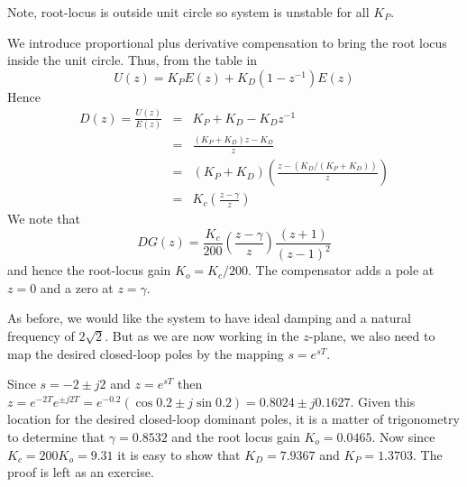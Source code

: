 \begin{slide}\label{slides:l12s18}
	\begin{center}
	\end{center}
	Note, root-locus is outside unit circle so system is unstable for all $K_P$.
\end{slide}

We introduce proportional plus derivative compensation to bring the root locus inside the unit circle. Thus, from the table in  $$U(z)=K_PE(z)+K_D(1-z^{-1})E(z)$$ Hence
\begin{eqnarray*}
	D(z) = \frac{U(z)}{E(z)} & = & K_P + K_D - K_D z^{-1} \\
	& = & \frac{(K_P+K_D)z - K_D}{z} \\
	& = & (K_P+K_D)\left(\frac{z-(K_D/(K_P+K_D))}{z}\right) \\
	& = & K_c\left(\frac{z-\gamma}{z}\right)
\end{eqnarray*}
We note that $$DG(z)=\frac{K_c}{200}\left(\frac{z-\gamma}{z}\right)\frac{(z+1)}{(z-1)^2}$$ and hence the root-locus gain $K_o=K_c/200$. The compensator adds a pole at $z=0$ and a zero at $z=\gamma$.

As before, we would like the system to have ideal damping and a natural frequency of $2\sqrt{2}$. But as we are now working in the $z$-plane, we also need to map the desired closed-loop poles by the mapping $s=e^{sT}$.

Since $s=-2\pm j2$ and $z=e^{sT}$ then $z=e^{-2T}e^{\pm j2T} = e^{-0.2}(\cos0.2\pm j\sin0.2) = 0.8024\pm j0.1627$. Given this location for the desired closed-loop dominant poles, it is a matter of trigonometry to determine that $\gamma=0.8532$ and the root locus gain $K_o=0.0465$. Now since $K_c=200 K_o = 9.31$ it is easy to show that $K_D=7.9367$ and $K_P=1.3703.$ The proof is left as an exercise.

\endinput

